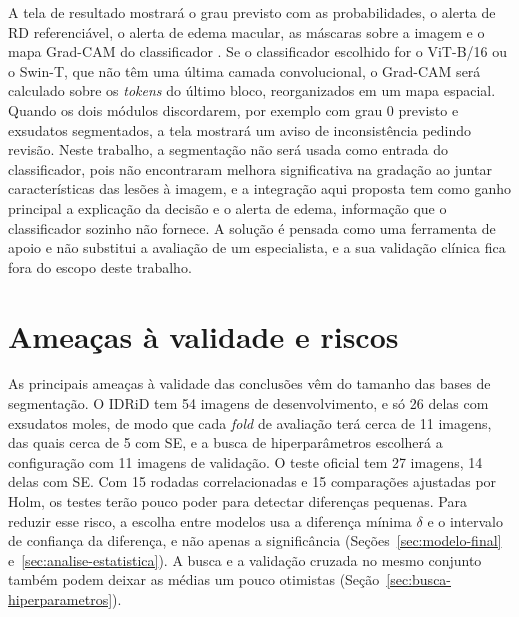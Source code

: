 A tela de resultado mostrará o grau previsto com as probabilidades, o alerta de RD referenciável, o alerta de edema macular, as máscaras sobre a imagem e o mapa Grad-CAM do classificador \cite{selvaraju2017gradcam}. Se o classificador escolhido for o ViT-B/16 ou o Swin-T, que não têm uma última camada convolucional, o Grad-CAM será calculado sobre os \textit{tokens} do último bloco, reorganizados em um mapa espacial. Quando os dois módulos discordarem, por exemplo com grau 0 previsto e exsudatos segmentados, a tela mostrará um aviso de inconsistência pedindo revisão. Neste trabalho, a segmentação não será usada como entrada do classificador, pois  não encontraram melhora significativa na gradação ao juntar características das lesões à imagem, e a integração aqui proposta tem como ganho principal a explicação da decisão e o alerta de edema, informação que o classificador sozinho não fornece. A solução é pensada como uma ferramenta de apoio e não substitui a avaliação de um especialista, e a sua validação clínica fica fora do escopo deste trabalho.

\section{Ameaças à validade e riscos}
\label{sec:ameacas-validade}

As principais ameaças à validade das conclusões vêm do tamanho das bases de segmentação. O IDRiD tem 54 imagens de desenvolvimento, e só 26 delas com exsudatos moles, de modo que cada \textit{fold} de avaliação terá cerca de 11 imagens, das quais cerca de 5 com SE, e a busca de hiperparâmetros escolherá a configuração com 11 imagens de validação. O teste oficial tem 27 imagens, 14 delas com SE. Com 15 rodadas correlacionadas e 15 comparações ajustadas por Holm, os testes terão pouco poder para detectar diferenças pequenas. Para reduzir esse risco, a escolha entre modelos usa a diferença mínima $\delta$ e o intervalo de confiança da diferença, e não apenas a significância (Seções~\ref{sec:modelo-final} e~\ref{sec:analise-estatistica}). A busca e a validação cruzada no mesmo conjunto também podem deixar as médias um pouco otimistas (Seção~\ref{sec:busca-hiperparametros}).

